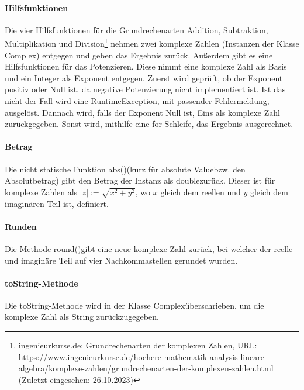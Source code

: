\documentclass[12pt]{article}
\begin{document}
\paragraph{Hilfsfunktionen}
Die vier Hilfsfunktionen für die Grundrechenarten Addition, Subtraktion, Multiplikation und Division\footnote{ingenieurkurse.de: Grundrechenarten der komplexen Zahlen, URL: \url{https://www.ingenieurkurse.de/hoehere-mathematik-analysis-lineare-algebra/komplexe-zahlen/grundrechenarten-der-komplexen-zahlen.html} (Zuletzt eingesehen: 26.10.2023)\label{ftn:grundrechenarten}} nehmen zwei komplexe Zahlen (Instanzen der Klasse \glqq Complex\grqq) entgegen und geben das Ergebnis zurück. 
Außerdem gibt es eine Hilfsfunktionen für das Potenzieren. Diese nimmt eine komplexe Zahl als Basis und ein Integer als Exponent entgegen. Zuerst wird geprüft, ob der Exponent positiv oder Null ist, da negative Potenzierung nicht implementiert ist. Ist das nicht der Fall wird eine \glqq RuntimeException\grqq, mit passender Fehlermeldung, ausgelöst. Dannach wird, falls der Exponent Null ist, Eins als komplexe Zahl zurückgegeben. Sonst wird, mithilfe eine \glqq for-Schleife\grqq, das Ergebnis ausgerechnet.

\paragraph{Betrag}
Die nicht statische Funktion \glqq abs()\grqq\space (kurz für \glqq absolute Value\grqq\space bzw. den Absolutbetrag) gibt den Betrag der Instanz als \glqq double\grqq\space zurück. Dieser ist für komplexe Zahlen als $|z| := \sqrt{x^2+y^2}$, wo $x$ gleich dem reellen und $y$ gleich dem imaginären Teil ist, definiert.

\paragraph{Runden}
Die Methode \glqq round()\grqq\space gibt eine neue komplexe Zahl zurück, bei welcher der reelle und imaginäre Teil auf vier Nachkommastellen gerundet wurden.

\paragraph{\glqq toString\grqq-Methode}
Die \glqq toString\grqq-Methode wird in der Klasse \glqq Complex\grqq\space überschrieben, um die komplexe Zahl als String zurückzugegeben.

\end{document}
